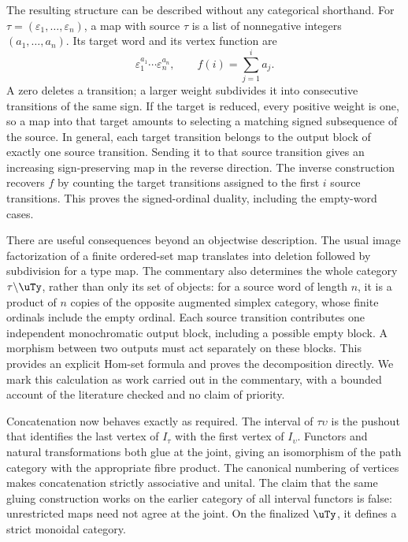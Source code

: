 The resulting structure can be described without any categorical shorthand. For $\tau=(\varepsilon_1,\ldots,\varepsilon_n)$, a map with source $\tau$ is a list of nonnegative integers $(a_1,\ldots,a_n)$. Its target word and its vertex function are
\[
 \varepsilon_1^{a_1}\cdots\varepsilon_n^{a_n},
 \qquad f(i)=\sum_{j=1}^{i}a_j.
\]
A zero deletes a transition; a larger weight subdivides it into consecutive transitions of the same sign. If the target is reduced, every positive weight is one, so a map into that target amounts to selecting a matching signed subsequence of the source. In general, each target transition belongs to the output block of exactly one source transition. Sending it to that source transition gives an increasing sign-preserving map in the reverse direction. The inverse construction recovers $f$ by counting the target transitions assigned to the first $i$ source transitions. This proves the signed-ordinal duality, including the empty-word cases.

There are useful consequences beyond an objectwise description. The usual image factorization of a finite ordered-set map translates into deletion followed by subdivision for a type map. The commentary also determines the whole category $\tau\backslash\uTy$, rather than only its set of objects: for a source word of length $n$, it is a product of $n$ copies of the opposite augmented simplex category, whose finite ordinals include the empty ordinal. Each source transition contributes one independent monochromatic output block, including a possible empty block. A morphism between two outputs must act separately on these blocks. This provides an explicit Hom-set formula and proves the decomposition directly. We mark this calculation as work carried out in the commentary, with a bounded account of the literature checked and no claim of priority.

Concatenation now behaves exactly as required. The interval of $\tau\upsilon$ is the pushout that identifies the last vertex of $I_\tau$ with the first vertex of $I_\upsilon$. Functors and natural transformations both glue at the joint, giving an isomorphism of the path category with the appropriate fibre product. The canonical numbering of vertices makes concatenation strictly associative and unital. The claim that the same gluing construction works on the earlier category of all interval functors is false: unrestricted maps need not agree at the joint. On the finalized $\uTy$, it defines a strict monoidal category.

